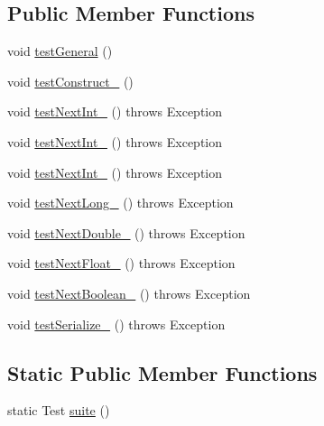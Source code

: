 \subsection*{Public Member Functions}
\begin{DoxyCompactItemize}
\item 
void \hyperlink{classorg_1_1jgap_1_1impl_1_1_stock_random_generator_test_a402f3a213f3db712c78430d9bc5e3504}{test\-General} ()
\item 
void \hyperlink{classorg_1_1jgap_1_1impl_1_1_stock_random_generator_test_adcd73ed17ada8f292187390b6d6fada7}{test\-Construct\-\_} ()
\item 
void \hyperlink{classorg_1_1jgap_1_1impl_1_1_stock_random_generator_test_a5d3bde14c68ea94e2f18d8c07c14a1e9}{test\-Next\-Int\-\_} ()  throws Exception 
\item 
void \hyperlink{classorg_1_1jgap_1_1impl_1_1_stock_random_generator_test_a3047e143cfb18b69e5002f15eeccf6e1}{test\-Next\-Int\-\_} ()  throws Exception 
\item 
void \hyperlink{classorg_1_1jgap_1_1impl_1_1_stock_random_generator_test_ad4409e54e737194609e81b3d6e282057}{test\-Next\-Int\-\_} ()  throws Exception 
\item 
void \hyperlink{classorg_1_1jgap_1_1impl_1_1_stock_random_generator_test_a916a2934f858c798f42a738c04c46cf4}{test\-Next\-Long\-\_} ()  throws Exception 
\item 
void \hyperlink{classorg_1_1jgap_1_1impl_1_1_stock_random_generator_test_ad1d0a05be3f00517aeae6c87d5c4609f}{test\-Next\-Double\-\_} ()  throws Exception 
\item 
void \hyperlink{classorg_1_1jgap_1_1impl_1_1_stock_random_generator_test_a758df44d47b962c9fa2c08a8f02808e2}{test\-Next\-Float\-\_} ()  throws Exception 
\item 
void \hyperlink{classorg_1_1jgap_1_1impl_1_1_stock_random_generator_test_a4cd397edb50840d8a1696bc0902a718c}{test\-Next\-Boolean\-\_} ()  throws Exception 
\item 
void \hyperlink{classorg_1_1jgap_1_1impl_1_1_stock_random_generator_test_a761623150c92eb54fb25c108aa5eca19}{test\-Serialize\-\_} ()  throws Exception 
\end{DoxyCompactItemize}
\subsection*{Static Public Member Functions}
\begin{DoxyCompactItemize}
\item 
static Test \hyperlink{classorg_1_1jgap_1_1impl_1_1_stock_random_generator_test_abe17185ccb5f319fdcfed9a09b3114b0}{suite} ()
\end{DoxyCompactItemize}
